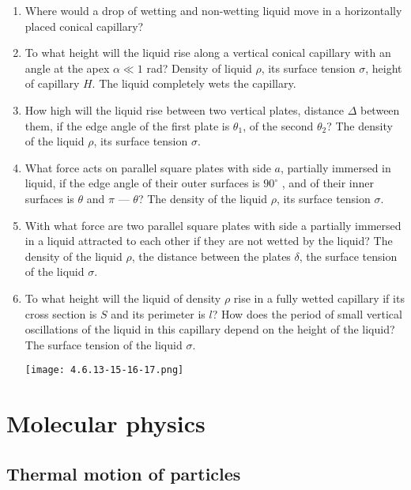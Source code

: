 \documentclass{article}
\begin{document}
\begin{enumerate}[label=4.6.\arabic*]
\item Where would a drop of wetting and non-wetting liquid move in a horizontally placed conical capillary? 

\item To what height will the liquid rise along a vertical conical capillary with an angle at the apex $\alpha \ll 1$ rad? Density of liquid $\rho$, its surface tension $\sigma$, height of capillary $H$. The liquid completely wets the capillary.

\item How high will the liquid rise between two vertical plates, distance $\Delta$ between them, if the edge angle of the first plate is $\theta_1$, of the second $\theta_2$? The density of the liquid $\rho$, its surface tension $\sigma$.

\item What force acts on parallel square plates with side $a$, partially immersed in liquid, if the edge angle of their outer surfaces is $90^\circ$ , and of their inner surfaces is $\theta$ and $\pi$ — $\theta$? The density of the liquid $\rho$, its surface tension $\sigma$.  

\item With what force are two parallel square plates with side a partially immersed in a liquid attracted to each other if they are not wetted by the liquid? The density of the liquid $\rho$, the distance between the plates $\delta$, the surface tension of the liquid $\sigma$.   

\item To what height will the liquid of density $\rho$ rise in a fully wetted capillary if its cross section is $S$ and its perimeter is $l$? How does the period of small vertical oscillations of the liquid in this capillary depend on the height of the liquid? The surface tension of the liquid $\sigma$.

\begin{center}
    \texttt{[image: 4.6.13-15-16-17.png]}
\end{center}


\end{enumerate}

\section{Molecular physics}

\subsection{Thermal motion of particles}
\end{document}
